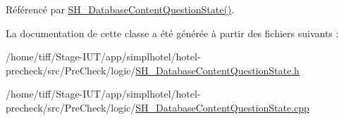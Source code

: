 Référencé par \hyperlink{classSH__DatabaseContentQuestionState_ab26490ea519262a8f9ca72c000bf7313}{S\-H\-\_\-\-Database\-Content\-Question\-State()}.



La documentation de cette classe a été générée à partir des fichiers suivants \-:\begin{DoxyCompactItemize}
\item 
/home/tiff/\-Stage-\/\-I\-U\-T/app/simplhotel/hotel-\/precheck/src/\-Pre\-Check/logic/\hyperlink{SH__DatabaseContentQuestionState_8h}{S\-H\-\_\-\-Database\-Content\-Question\-State.\-h}\item 
/home/tiff/\-Stage-\/\-I\-U\-T/app/simplhotel/hotel-\/precheck/src/\-Pre\-Check/logic/\hyperlink{SH__DatabaseContentQuestionState_8cpp}{S\-H\-\_\-\-Database\-Content\-Question\-State.\-cpp}\end{DoxyCompactItemize}
